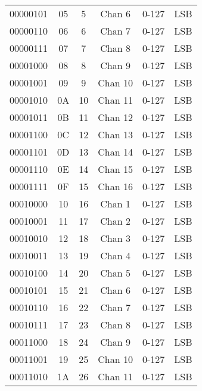 \begin{center}
\begin{supertabular}{| c | c | c | c | c | c |}
                00000101 & 05 &  5  & Chan 6   & 0-127 & LSB \\
             00000110 & 06 &  6  & Chan 7   & 0-127 & LSB \\
                00000111 & 07 &  7  & Chan 8   & 0-127 & LSB \\
             00001000 & 08 &  8  & Chan 9   & 0-127 & LSB \\
                00001001 & 09 &  9  & Chan 10  & 0-127 & LSB \\
             00001010 & 0A & 10  & Chan 11  & 0-127 & LSB \\
                00001011 & 0B & 11  & Chan 12  & 0-127 & LSB \\
             00001100 & 0C & 12  & Chan 13  & 0-127 & LSB \\
                00001101 & 0D & 13  & Chan 14  & 0-127 & LSB \\
             00001110 & 0E & 14  & Chan 15  & 0-127 & LSB \\
                00001111 & 0F & 15  & Chan 16  & 0-127 & LSB \\
             00010000 & 10 & 16  & Chan 1   & 0-127 & LSB \\
                00010001 & 11 & 17  & Chan 2   & 0-127 & LSB \\
             00010010 & 12 & 18  & Chan 3   & 0-127 & LSB \\
                00010011 & 13 & 19  & Chan 4   & 0-127 & LSB \\
             00010100 & 14 & 20  & Chan 5   & 0-127 & LSB \\
                00010101 & 15 & 21  & Chan 6   & 0-127 & LSB \\
             00010110 & 16 & 22  & Chan 7   & 0-127 & LSB \\
                00010111 & 17 & 23  & Chan 8   & 0-127 & LSB \\
             00011000 & 18 & 24  & Chan 9   & 0-127 & LSB \\
                00011001 & 19 & 25  & Chan 10  & 0-127 & LSB \\
             00011010 & 1A & 26  & Chan 11  & 0-127 & LSB \\

\end{supertabular}
\end{center}
